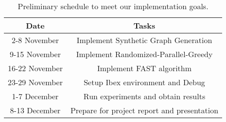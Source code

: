 \documentclass[11pt, a4paper]{article}
\begin{document}
\begin{table}[H]
    \begin{center}
        \begin{tabular}{||c c||} 
         \hline
         Date & Tasks \\
         \hline\hline
         2-8 November & Implement Synthetic Graph Generation  \\ 
         \hline
         9-15 November & Implement Randomized-Parallel-Greedy \\
         \hline
         16-22 November & Implement FAST algorithm  \\
         \hline
         23-29 November & Setup Ibex environment and Debug  \\
         \hline
         1-7 December & Run experiments and obtain results  \\
         \hline
         8-13 December & Prepare for project report and presentation  \\
         \hline
        \end{tabular}
    \caption{Preliminary schedule to meet our implementation goals.}
    \label{tab:schedule}
    \end{center}
\end{table}
\clearpage
\end{document}

